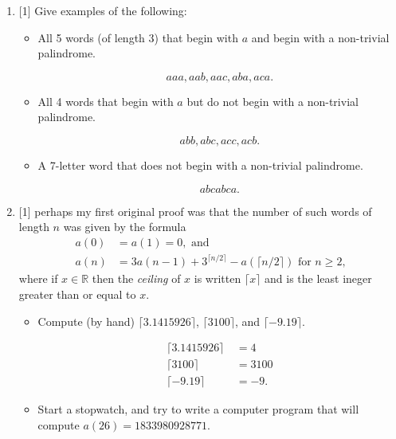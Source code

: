 \documentclass{article}
\begin{document}
\begin{enumerate}
    \item {
        [1] Give examples of the following:
        \begin{itemize}
            \item {
                All 5 words (of length 3) that begin with \(a\) and begin with
                a non-trivial palindrome. 

                \[aaa, aab, aac, aba, aca.\]
            }

            \item{
                All 4 words that begin with \(a\) but do not begin with a non-trivial palindrome.

                \[abb, abc, acc, acb.\]
            }

            \item {
                A 7-letter word that does not begin with a non-trivial palindrome.

                \[abcabca.\]
            }
        \end{itemize}
    }

    \item {
        [1] perhaps my first original proof was that the number of 
        such words of length \(n\) was given by the formula
        \begin{align*}a(0) &= a(1) = 0, \text{ and}\\ a(n) &= 3a(n-1) + 3^{\lceil n/2 \rceil} - a(\lceil n/2 \rceil)\text{ for } n \geq 2 \text{,} \end{align*}
        where if \(x \in \mathbb{R}\) then the \emph{ceiling} of \(x\) is written 
        \(\lceil x \rceil\) and is the least ineger greater than or equal to \(x\).

        \begin{itemize}
            \item {
                Compute (by hand) \(\lceil 3.1415926 \rceil\), \(\lceil 3100 \rceil\), 
                and \(\lceil -9.19 \rceil\).

                \begin{align*}
                    \lceil 3.1415926 \rceil\ &= 4\\
                    \lceil 3100 \rceil\ &= 3100\\
                    \lceil -9.19 \rceil\ &= -9.
                \end{align*}
            }

            \item {
                Start a stopwatch, and try to write a computer program that will 
                compute \(a(26) = 1833980928771\). 

                
            }
        \end{itemize}
    }
    
\end{enumerate}


\end{document}
